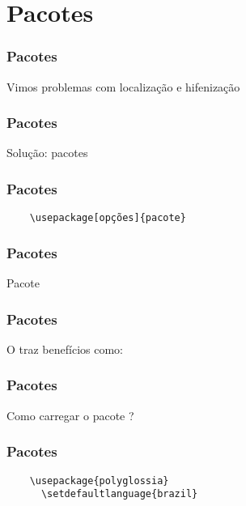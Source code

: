 \section{Pacotes}

\begin{frame}
  \frametitle{Pacotes}
  \LARGE
  Vimos problemas com localização e hifenização
\end{frame}

\begin{frame}
  \frametitle{Pacotes}
  \Huge
  Solução: pacotes
\end{frame}

\begin{frame}[fragile]
  \frametitle{Pacotes}
  \begin{verbatim}
    \usepackage[opções]{pacote}
  \end{verbatim}
\end{frame}

\begin{frame}
  \frametitle{Pacotes}
  \Huge
  Pacote 
\end{frame}

\begin{frame}
  \frametitle{Pacotes}
  \Huge
  O  traz benefícios como:
  \begin{itemize}
  \end{itemize}
\end{frame}

\begin{frame}
  \frametitle{Pacotes}
  \Huge
  Como carregar o pacote ?
\end{frame}

\begin{frame}[fragile]
  \frametitle{Pacotes}
  \begin{verbatim}
    \usepackage{polyglossia}
      \setdefaultlanguage{brazil}
  \end{verbatim}
\end{frame}

